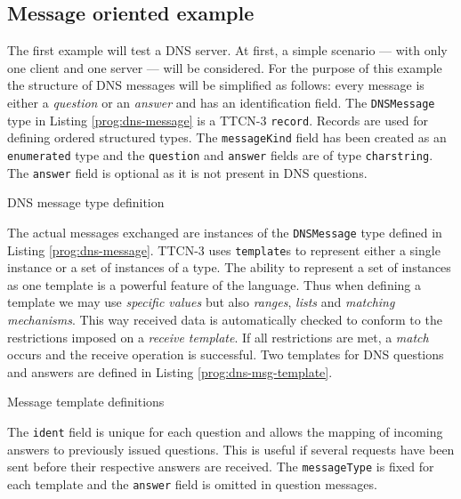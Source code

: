 \subsection{Message oriented example}

The first example will test a \ac{DNS} server.
At first, a simple scenario --- with only one client and one server ---
will be considered.
For the purpose of this example
the structure of \ac{DNS} messages will be simplified as follows:
every message is either a \emph{question} or an \emph{answer}
and has an identification field.
The \verb=DNSMessage= type in Listing \ref{prog:dns-message}
is a \ac{TTCN-3} \verb=record=.
Records are used for defining ordered structured types.
The \verb=messageKind= field has been created as an \verb=enumerated= type
and the \verb=question= and \verb=answer= fields are of type \verb=charstring=.
The \verb=answer= field is optional as it is not present in \ac{DNS} questions.

\begin{program}
\caption{DNS message type definition\label{prog:dns-message}}
\end{program}

The actual messages exchanged are instances
of the \verb=DNSMessage= type defined in Listing \ref{prog:dns-message}.
\ac{TTCN-3} uses \verb=template=s to represent either a single instance
or a set of instances of a type.
The ability to represent a set of instances as one template
is a powerful feature of the language.
Thus when defining a template we may use \emph{specific values} but also
\emph{ranges}, \emph{lists} and \emph{matching mechanisms}.
This way received data is automatically checked
to conform to the restrictions imposed on a \emph{receive template}.
If all restrictions are met,
a \emph{match} occurs and the receive operation is successful.
Two templates for \ac{DNS} questions and answers
are defined in Listing \ref{prog:dns-msg-template}.

\begin{program}
\caption{Message template definitions\label{prog:dns-msg-template}}
\end{program}

The \verb=ident= field is unique for each question
and allows the mapping of incoming answers to previously issued questions.
This is useful if several requests have been sent
before their respective answers are received.
The \verb=messageType= is fixed for each template
and the \verb=answer= field is omitted in question messages.

